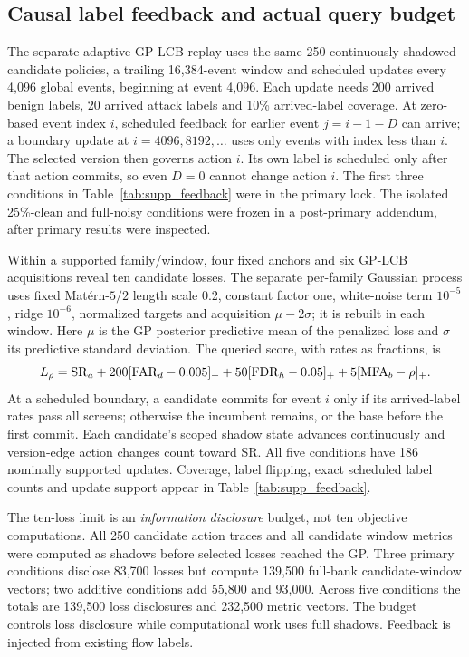 \documentclass[10pt,onecolumn]{IEEEtran}
\begin{document}
\subsection{Causal label feedback and actual query budget}
The separate adaptive GP-LCB replay uses the same
250 continuously shadowed candidate policies, a
trailing 16,384-event window and scheduled updates
every 4,096 global events, beginning at event 4,096.
Each update needs 200 arrived benign labels,
20 arrived attack labels and 10\% arrived-label
coverage. At zero-based event index \(i\), scheduled
feedback for earlier event \(j=i-1-D\) can arrive;
a boundary update at \(i=4096,8192,\ldots\) uses
only events with index less than \(i\). The selected
version then governs action \(i\). Its own label is
scheduled only after that action commits, so even
\(D=0\) cannot change action \(i\). The first three conditions
in Table~\ref{tab:supp_feedback} were in the primary
lock. The isolated 25\%-clean and full-noisy
conditions were frozen in a post-primary addendum,
after primary results were inspected.

Within a supported family/window, four fixed anchors
and six GP-LCB acquisitions reveal ten candidate
losses. The separate per-family Gaussian process uses
fixed Mat\'ern-\(5/2\) length scale 0.2, constant
factor one, white-noise term \(10^{-5}\), ridge
\(10^{-6}\), normalized targets and acquisition
\(\mu-2\sigma\); it is rebuilt in each window.
Here \(\mu\) is the GP posterior predictive mean of the penalized loss
and \(\sigma\) its predictive standard deviation.
The queried score, with rates as fractions, is
\[
 L_\rho={\rm SR}_{a}
 +200[{\rm FAR}_{d}-0.005]_+
 +50[{\rm FDR}_{h}-0.05]_+
 +5[{\rm MFA}_{b}-\rho]_+ .
\]
At a scheduled boundary, a candidate commits for
event \(i\) only if its arrived-label rates pass all
screens; otherwise the incumbent remains, or the
base before the first commit. Each candidate's
scoped shadow state advances continuously and
version-edge action changes count toward SR.
All five conditions have 186 nominally supported
updates. Coverage, label flipping, exact scheduled
label counts and update support appear in
Table~\ref{tab:supp_feedback}.


The ten-loss limit is an \emph{information disclosure}
budget, not ten objective computations. All
250 candidate action traces and all candidate
window metrics were computed as shadows before
selected losses reached the GP. Three primary
conditions disclose 83,700 losses but compute
139,500 full-bank candidate-window vectors;
two additive conditions add 55,800 and 93,000.
Across five conditions the totals are 139,500
loss disclosures and 232,500 metric vectors.
The budget controls loss disclosure while
computational work uses full shadows. Feedback
is injected from existing flow labels.
\end{document}
